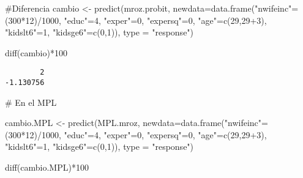 \documentclass[
  letterpaper,
  DIV=11,
  numbers=noendperiod]{scrreprt}
\newenvironment{Shaded}{\begin{snugshade}}{\end{snugshade}}
\newcommand{\AttributeTok}[1]{\textcolor[rgb]{0.40,0.45,0.13}{#1}}
\newcommand{\CommentTok}[1]{\textcolor[rgb]{0.37,0.37,0.37}{#1}}
\newcommand{\DecValTok}[1]{\textcolor[rgb]{0.68,0.00,0.00}{#1}}
\newcommand{\FunctionTok}[1]{\textcolor[rgb]{0.28,0.35,0.67}{#1}}
\newcommand{\NormalTok}[1]{\textcolor[rgb]{0.00,0.23,0.31}{#1}}
\newcommand{\OtherTok}[1]{\textcolor[rgb]{0.00,0.23,0.31}{#1}}
\newcommand{\SpecialCharTok}[1]{\textcolor[rgb]{0.37,0.37,0.37}{#1}}
\newcommand{\StringTok}[1]{\textcolor[rgb]{0.13,0.47,0.30}{#1}}
\begin{document}
\begin{Shaded}
\begin{Highlighting}[]
\CommentTok{\#Diferencia}
\NormalTok{cambio }\OtherTok{\textless{}{-}} \FunctionTok{predict}\NormalTok{(mroz.probit,}
                    \AttributeTok{newdata=}\FunctionTok{data.frame}\NormalTok{(}\StringTok{"nwifeinc"}\OtherTok{=}\NormalTok{(}\DecValTok{300}\SpecialCharTok{*}\DecValTok{12}\NormalTok{)}\SpecialCharTok{/}\DecValTok{1000}\NormalTok{,}
                                       \StringTok{"educ"}\OtherTok{=}\DecValTok{4}\NormalTok{,}
                                       \StringTok{"exper"}\OtherTok{=}\DecValTok{0}\NormalTok{,}
                                       \StringTok{"expersq"}\OtherTok{=}\DecValTok{0}\NormalTok{,}
                                       \StringTok{"age"}\OtherTok{=}\FunctionTok{c}\NormalTok{(}\DecValTok{29}\NormalTok{,}\DecValTok{29}\SpecialCharTok{+}\DecValTok{3}\NormalTok{),}
                                       \StringTok{"kidslt6"}\OtherTok{=}\DecValTok{1}\NormalTok{,}
                                       \StringTok{"kidsge6"}\OtherTok{=}\FunctionTok{c}\NormalTok{(}\DecValTok{0}\NormalTok{,}\DecValTok{1}\NormalTok{)),}
                    \AttributeTok{type =} \StringTok{"response"}\NormalTok{)}

\FunctionTok{diff}\NormalTok{(cambio)}\SpecialCharTok{*}\DecValTok{100}
\end{Highlighting}
\end{Shaded}

\begin{verbatim}
        2 
-1.130756 
\end{verbatim}

\begin{Shaded}
\begin{Highlighting}[]
\CommentTok{\# En el MPL}

\NormalTok{cambio.MPL }\OtherTok{\textless{}{-}} \FunctionTok{predict}\NormalTok{(MPL.mroz,}
                    \AttributeTok{newdata=}\FunctionTok{data.frame}\NormalTok{(}\StringTok{"nwifeinc"}\OtherTok{=}\NormalTok{(}\DecValTok{300}\SpecialCharTok{*}\DecValTok{12}\NormalTok{)}\SpecialCharTok{/}\DecValTok{1000}\NormalTok{,}
                                       \StringTok{"educ"}\OtherTok{=}\DecValTok{4}\NormalTok{,}
                                       \StringTok{"exper"}\OtherTok{=}\DecValTok{0}\NormalTok{,}
                                       \StringTok{"expersq"}\OtherTok{=}\DecValTok{0}\NormalTok{,}
                                       \StringTok{"age"}\OtherTok{=}\FunctionTok{c}\NormalTok{(}\DecValTok{29}\NormalTok{,}\DecValTok{29}\SpecialCharTok{+}\DecValTok{3}\NormalTok{),}
                                       \StringTok{"kidslt6"}\OtherTok{=}\DecValTok{1}\NormalTok{,}
                                       \StringTok{"kidsge6"}\OtherTok{=}\FunctionTok{c}\NormalTok{(}\DecValTok{0}\NormalTok{,}\DecValTok{1}\NormalTok{)),}
                    \AttributeTok{type =} \StringTok{"response"}\NormalTok{)}

\FunctionTok{diff}\NormalTok{(cambio.MPL)}\SpecialCharTok{*}\DecValTok{100}
\end{Highlighting}
\end{Shaded}
\end{document}
